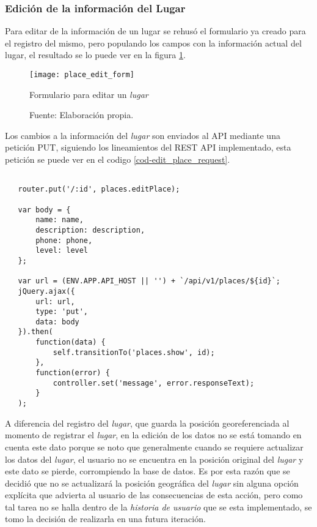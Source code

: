 \subsubsection{Edición de la información del Lugar}

Para editar de la información de un lugar se rehusó el formulario ya creado para el registro del mismo, pero populando los campos con la información actual del lugar, el resultado se lo puede ver en la figura \ref{fig:place_edit_form}. \\

\begin{figure}[H]
     \begin{center}
       \texttt{[image: place\_edit\_form]}

       \caption{Formulario para editar un \emph{lugar}}
       \label{fig:place_edit_form}
       \caption*{Fuente: Elaboración propia.}
     \end{center}
\end{figure}


Los cambios a la información del \emph{lugar} son enviados al API mediante una petición PUT, siguiendo los lineamientos del REST API implementado, esta petición se puede ver en el codigo \ref{cod-edit_place_request}.

\begin{center}
 \begin{lstlisting}[label=cod-edit_place_request,caption=Petición HTTP para editar un lugar.]

   router.put('/:id', places.editPlace);

   var body = {
       name: name,
       description: description,
       phone: phone,
       level: level
   };

   var url = (ENV.APP.API_HOST || '') + `/api/v1/places/${id}`;
   jQuery.ajax({
       url: url,
       type: 'put',
       data: body
   }).then(
       function(data) {
           self.transitionTo('places.show', id);
       },
       function(error) {
           controller.set('message', error.responseText);
       }
   );

 \end{lstlisting}
\end{center}

A diferencia del registro del \emph{lugar}, que guarda la posición georeferenciada al momento de registrar el \emph{lugar}, en la edición de los datos no se está tomando en cuenta este dato porque se noto que generalmente cuando se requiere actualizar los datos del \emph{lugar}, el usuario no se encuentra en la posición original del \emph{lugar} y este dato se pierde, corrompiendo la base de datos. Es por esta razón que se decidió que no se actualizará la posición geográfica del \emph{lugar} sin alguna opción explícita que advierta al usuario de las consecuencias de esta acción, pero como tal tarea no se halla dentro de la \emph{historia de usuario} que se esta implementado, se tomo la decisión de realizarla en una futura iteración.








